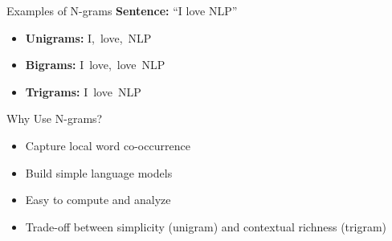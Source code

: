 \begin{frame}{Examples of N-grams}
    \textbf{Sentence:} ``I love NLP''

    \vspace{1em}
    \begin{itemize}
        \item \textbf{Unigrams:} I,\ love,\ NLP
        \item \textbf{Bigrams:} I\ love,\ love\ NLP
        \item \textbf{Trigrams:} I\ love\ NLP
    \end{itemize}
\end{frame}

\begin{frame}{Why Use N-grams?}
    \begin{itemize}
        \item Capture local word co-occurrence
        \item Build simple language models
        \item Easy to compute and analyze
        \item Trade-off between simplicity (unigram) and contextual richness (trigram)
    \end{itemize}
\end{frame}
